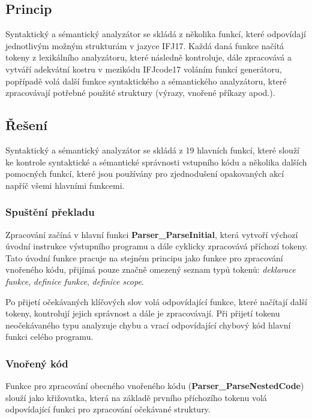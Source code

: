 \documentclass[a4paper,11pt]{article}
\begin{document}
\subsection{Princip} \label{syse-princip}
Syntaktický a sémantický analyzátor se skládá z několika funkcí, které odpovídají jednotlivým možným strukturám v jazyce IFJ17. Každá daná funkce načítá tokeny z lexikálního analyzátoru, které následně kontroluje, dále zpracovává a vytváří adekvátní kostru v mezikódu IFJcode17 voláním funkcí generátoru, popřípadě volá další funkce syntaktického a sémantického analyzátoru, které zpracovávají potřebné použité struktury (výrazy, vnořené příkazy apod.).

\subsection{Řešení} \label{syse-reseni}
Syntaktický a sémantický analyzátor se skládá z 19 hlavních funkcí, které slouží ke kontrole syntaktické a sémantické správnosti vstupního kódu a několika dalších pomocných funkcí, které jsou používány pro zjednodušení opakovaných akcí napříč všemi hlavními funkcemi.

\subsubsection{Spuštění překladu} \label{syse-reseni-uvod}
Zpracování začíná v hlavní funkci \textbf{Parser\_ParseInitial}, která vytvoří výchozí úvodní instrukce výstupního programu a dále cyklicky zpracovává příchozí tokeny. Tato úvodní funkce pracuje na stejném principu jako funkce pro zpracování vnořeného kódu, přijímá pouze značně omezený seznam typů tokenů: \textit{deklarace funkce}, \textit{definice funkce}, \textit{definice scope}. 

\vspace{2mm}
Po přijetí očekávaných klíčových slov volá odpovídající funkce, které načítají další tokeny, kontrolují jejich správnost a dále je zpracovávají. Při přijetí tokenu neočekávaného typu analyzuje chybu a vrací odpovídající chybový kód hlavní funkci celého programu.

\subsubsection{Vnořený kód} \label{syse-reseni-vnoreny_kod}
Funkce pro zpracování obecného vnořeného kódu (\textbf{Parser\_ParseNestedCode}) slouží jako křižovatka, která na základě prvního příchozího tokenu volá odpovídající funkci pro zpracování očekávané struktury.
\end{document}
